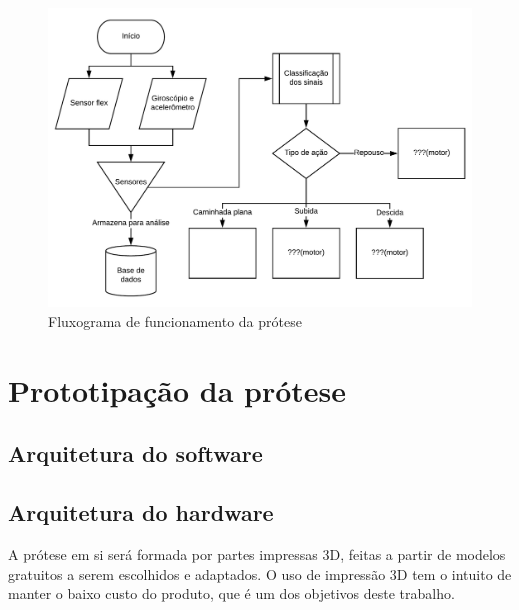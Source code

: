 \begin{figure}[h]
	\caption{\label{fig:flowchart}Fluxograma de funcionamento da prótese}
	\begin{center}
	    \includegraphics[width=\textwidth]{resources/flowchart}
	\end{center}
\end{figure}

\section{Prototipação da prótese}

\subsection{Arquitetura do software}

\subsection{Arquitetura do hardware}
A prótese em si será formada por partes impressas 3D, feitas a partir de modelos gratuitos a serem escolhidos e adaptados. O uso de impressão 3D tem o intuito de manter o baixo custo do produto, que é um dos objetivos deste trabalho.

